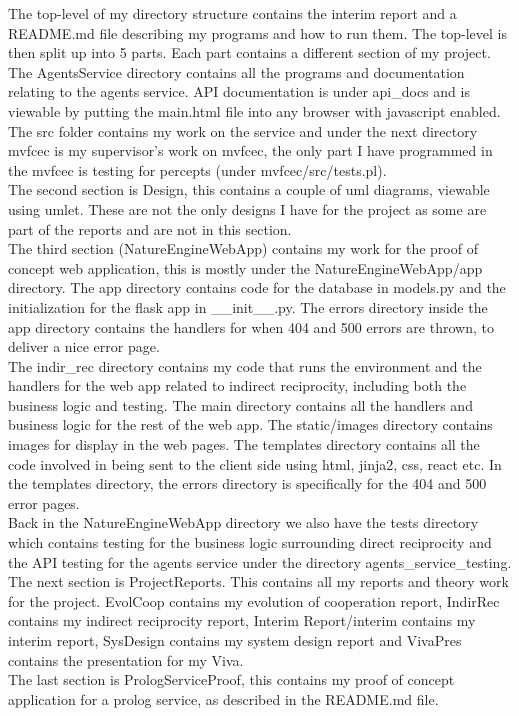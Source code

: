 \documentclass[]{final_report}
\begin{document}
The top-level of my directory structure contains the interim report and a README.md file describing my programs and how to run them. The top-level is then split up into 5 parts. Each part contains a different section of my project. The AgentsService directory contains all the programs and documentation relating to the agents service. API documentation is under api\_docs and is viewable by putting the main.html file into any browser with javascript enabled. The src folder contains my work on the service and under the next directory mvfcec is my supervisor's work on mvfcec, the only part I have programmed in the mvfcec is testing for percepts (under mvfcec/src/tests.pl).\\
The second section is Design, this contains a couple of uml diagrams, viewable using umlet. These are not the only designs I have for the project as some are part of the reports and are not in this section.\\
The third section (NatureEngineWebApp) contains my work for the proof of concept web application, this is mostly under the NatureEngineWebApp/app directory. The app directory contains code for the database in models.py and the initialization for the flask app in \_\_init\_\_.py. The errors directory inside the app directory contains the handlers for when 404 and 500 errors are thrown, to deliver a nice error page.\\
The indir\_rec directory contains my code that runs the environment and the handlers for the web app related to indirect reciprocity, including both the business logic and testing. The main directory contains all the handlers and business logic for the rest of the web app. The static/images directory contains images for display in the web pages. The templates directory contains all the code involved in being sent to the client side using html, jinja2, css, react etc. In the templates directory, the errors directory is specifically for the 404 and 500 error pages.\\
Back in the NatureEngineWebApp directory we also have the tests directory which contains testing for the business logic surrounding direct reciprocity and the API testing for the agents service under the directory agents\_service\_testing.\\
The next section is ProjectReports. This contains all my reports and theory work for the project. EvolCoop contains my evolution of cooperation report, IndirRec contains my indirect reciprocity report, Interim Report/interim contains my interim report, SysDesign contains my system design report and VivaPres contains the presentation for my Viva.\\
The last section is PrologServiceProof, this contains my proof of concept application for a prolog service, as described in the README.md file. 









\end{document}

